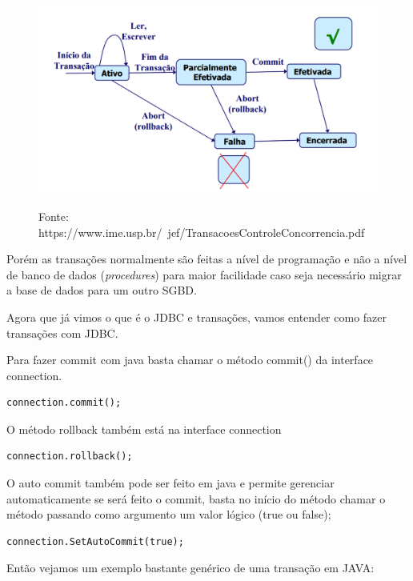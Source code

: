 \documentclass[12pt,a4paper]{article}
\begin{document}
\begin{figure}[h!]
\centering
\includegraphics[width=15cm]{recursos/imagens/commit_rollback.png}
\label{4}
\caption{Fonte: https://www.ime.usp.br/~jef/TransacoesControleConcorrencia.pdf}
\end{figure} 

Porém as transações normalmente são feitas a nível de programação e não a nível de banco de dados (\textit{procedures}) para maior facilidade caso seja necessário migrar a base de dados para um outro SGBD. 

Agora que já vimos o que é o JDBC e transações, vamos entender como fazer transações com JDBC.

Para fazer commit com java basta chamar o método commit() da interface connection.

\begin{lstlisting}
connection.commit();
\end{lstlisting}

O método rollback também está na interface connection

\begin{lstlisting}
connection.rollback();
\end{lstlisting}

O auto commit também pode ser feito em java e permite gerenciar automaticamente se será feito o commit, basta no início do método chamar o método passando como argumento um valor lógico (true ou false);

\begin{lstlisting}
connection.SetAutoCommit(true);
\end{lstlisting}

Então vejamos um exemplo bastante genérico de uma transação em JAVA:


 
\end{document}
